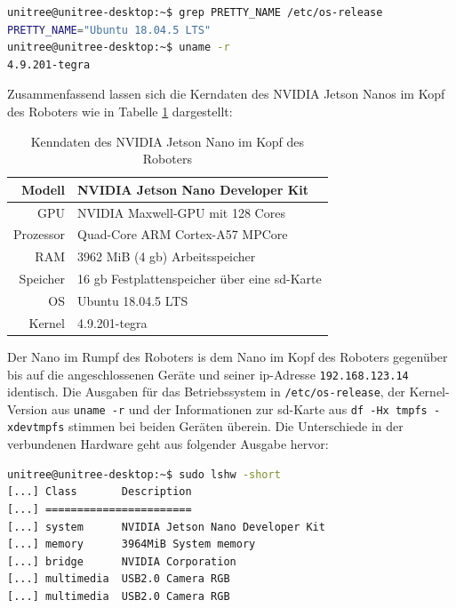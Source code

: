 \begin{lstlisting}[language=sh, label=lst:nanos-kopf-os]
unitree@unitree-desktop:~$ grep PRETTY_NAME /etc/os-release
PRETTY_NAME="Ubuntu 18.04.5 LTS"
unitree@unitree-desktop:~$ uname -r
4.9.201-tegra
\end{lstlisting}

Zusammenfassend lassen sich die Kerndaten des NVIDIA Jetson Nanos im Kopf des Roboters wie in Tabelle \ref{tab:data-head-nano} dargestellt:

\begin{table}[h]
    \centering
    \begin{tabular}{|r|l|}
        \hline
        Modell    & NVIDIA Jetson Nano Developer Kit\\ \hline
        GPU       & NVIDIA Maxwell-GPU mit 128 Cores\\ \hline
        Prozessor & Quad-Core ARM Cortex-A57 MPCore\\ \hline
        RAM       & \num{3962} MiB (\num{4} \gls{gb}) Arbeitsspeicher\\ \hline
        Speicher  & \num{16} \gls{gb} Festplattenspeicher über eine \gls{sd}-Karte\\ \hline
        OS        & Ubuntu 18.04.5 LTS\\ \hline
        Kernel    & 4.9.201-tegra \\ \hline
    \end{tabular}\caption{Kenndaten des NVIDIA Jetson Nano im Kopf des Roboters}\label{tab:data-head-nano}
\end{table}


\label{par:nano-rumpf}

Der Nano im Rumpf des Roboters is dem Nano im Kopf des Roboters gegenüber bis auf die angeschlossenen Geräte und seiner
\gls{ip}-Adresse \texttt{192\allowbreak .168\allowbreak .123\allowbreak .14} identisch.
Die Ausgaben für das Betriebssystem in \texttt{/etc/os-release}, der Kernel-Version aus \texttt{uname -r} und der Informationen
zur \gls{sd}-Karte aus \texttt{df -Hx tmpfs -xdevtmpfs} stimmen bei beiden Geräten überein.
Die Unterschiede in der verbundenen Hardware geht aus folgender Ausgabe hervor:

\begin{lstlisting}[language=sh, label=lst:nanos-hardware-rumpf, columns=fixed]
unitree@unitree-desktop:~$ sudo lshw -short
[...] Class       Description
[...] =======================
[...] system      NVIDIA Jetson Nano Developer Kit
[...] memory      3964MiB System memory
[...] bridge      NVIDIA Corporation
[...] multimedia  USB2.0 Camera RGB
[...] multimedia  USB2.0 Camera RGB
\end{lstlisting}

